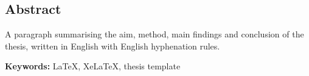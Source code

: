 \begin{english}
  \chapter*{Abstract}

  A paragraph summarising the aim, method, main findings and conclusion of
  the thesis, written in English with English hyphenation rules.

  \vspace{1em}
  \noindent\textbf{Keywords:} LaTeX, XeLaTeX, thesis template
\end{english}
